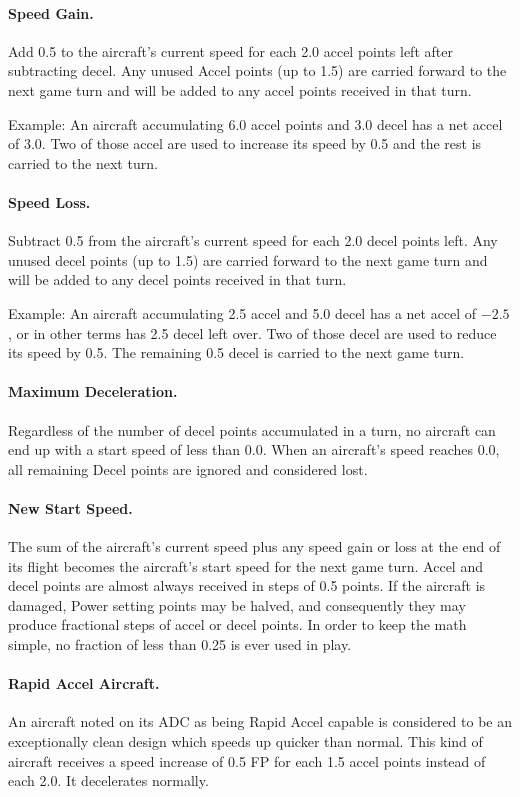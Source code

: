 \paragraph{Speed Gain.} Add 0.5 to the aircraft's current speed for each 2.0 accel points left after subtracting decel.  Any unused Accel points (up to 1.5) are carried forward to the next game turn and will be added to any accel points received in that turn.

Example: An aircraft accumulating 6.0 accel points and 3.0 decel has a net accel of 3.0. Two of those accel are used to increase its speed by 0.5 and the rest is carried to the next turn.

\paragraph{Speed Loss.} Subtract 0.5 from the aircraft's current speed for each 2.0 decel points left. Any unused decel points (up to 1.5) are carried forward to the next game turn and will be added to any decel points received in that turn.

Example: An aircraft accumulating 2.5 accel and 5.0 decel has a net accel of $-2.5$, or in other terms has 2.5 decel left over. Two of those decel are used to reduce its speed by 0.5. The remaining 0.5 decel is carried to the next game turn.

\paragraph{Maximum Deceleration.} Regardless of the number of decel points accumulated in a turn, no aircraft can end up with a start speed of less than 0.0. When an aircraft's speed reaches 0.0, all remaining Decel points are ignored and considered lost.

\paragraph{New Start Speed.} The sum of the aircraft's current speed plus any speed gain or loss at the end of its flight becomes the aircraft's start speed for the next game turn. Accel and decel points are almost always received in steps of 0.5 points. If the aircraft is damaged, Power setting points may be halved, and consequently they may produce fractional steps of accel or decel points. In order to keep the math simple, no fraction of less than 0.25 is ever used in play.

\paragraph{Rapid Accel Aircraft.} An aircraft noted on its ADC as being Rapid Accel capable is considered to be an exceptionally clean design which speeds up quicker than normal. This kind of aircraft receives a speed increase of 0.5 FP for each 1.5 accel points instead of each 2.0. It decelerates normally.

